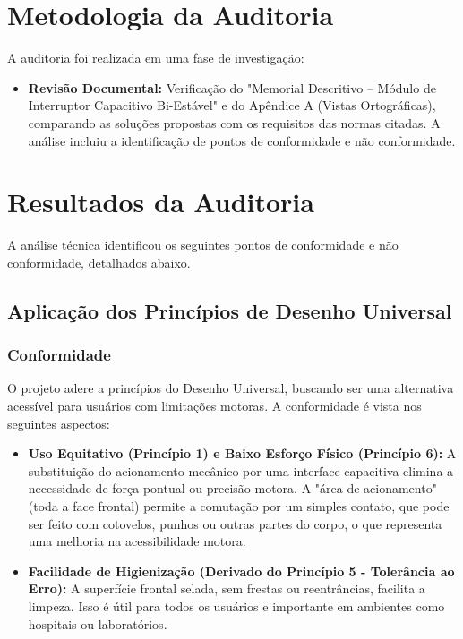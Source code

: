 \documentclass[12pt, openright, a4paper, openany, oneside, chapter=TITLE, section=TITLE, subsection=TITLE, subsubsection=TITLE, subsubsubsection=TITLE, subsubsubsection=TITLE, brazil]{abntex2}
\begin{document}
\chapter{Metodologia da Auditoria}
\label{sec:metodologia}

A auditoria foi realizada em uma fase de investigação:

\begin{itemize}
    \item \textbf{Revisão Documental:} Verificação do "Memorial Descritivo – Módulo de Interruptor Capacitivo Bi-Estável" e do Apêndice A (Vistas Ortográficas), comparando as soluções propostas com os requisitos das normas citadas. A análise incluiu a identificação de pontos de conformidade e não conformidade.
\end{itemize}


\chapter{Resultados da Auditoria}
\label{sec:resultados}

A análise técnica identificou os seguintes pontos de conformidade e não conformidade, detalhados abaixo.

\section{Aplicação dos Princípios de Desenho Universal}

\subsection{Conformidade}
O projeto adere a princípios do Desenho Universal, buscando ser uma alternativa acessível para usuários com limitações motoras. A conformidade é vista nos seguintes aspectos:

\begin{itemize}
    \item \textbf{Uso Equitativo (Princípio 1) e Baixo Esforço Físico (Princípio 6):} A substituição do acionamento mecânico por uma interface capacitiva elimina a necessidade de força pontual ou precisão motora. A "área de acionamento" (toda a face frontal) permite a comutação por um simples contato, que pode ser feito com cotovelos, punhos ou outras partes do corpo, o que representa uma melhoria na acessibilidade motora.
    
    \item \textbf{Facilidade de Higienização (Derivado do Princípio 5 - Tolerância ao Erro):} A superfície frontal selada, sem frestas ou reentrâncias, facilita a limpeza. Isso é útil para todos os usuários e importante em ambientes como hospitais ou laboratórios.
\end{itemize}
\end{document}
